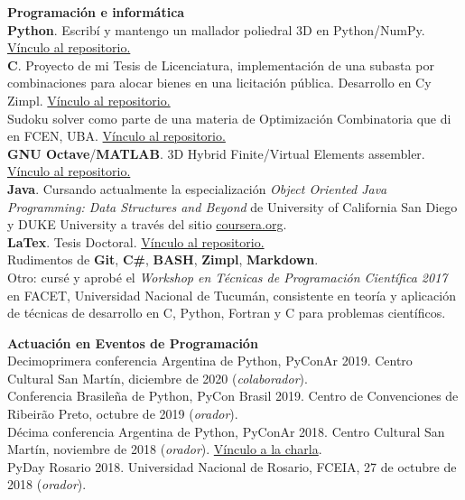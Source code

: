 \textbf{Programaci\'on e inform\'atica}\\[6pt]
\textbf{Python}. Escrib\'i y mantengo un mallador poliedral 3D en Python/NumPy. 
\href{https://github.com/alexisjawtu/mesher}{\color{blue}V\'inculo al repositorio.}\\[3pt]
\textbf{C\masmas}. Proyecto de mi Tesis de Licenciatura, implementaci\'on de una 
subasta por combinaciones para alocar bienes en una licitaci\'on p\'ublica. Desarrollo
en C\masmas y Zimpl. 
\href{https://github.com/alexisjawtu/ilp_auction}{\color{blue}V\'inculo al repositorio.}\\[3pt]
Sudoku solver como parte de una materia de Optimizaci\'on Combinatoria que di en FCEN, UBA.
\href{https://github.com/alexisjawtu/sudoku}{\color{blue}V\'inculo al repositorio.}\\[3pt]
\textbf{GNU Octave}/\textbf{MATLAB}. 3D Hybrid Finite/Virtual Elements assembler. 
\href{https://github.com/alexisjawtu/virtualAssembler}{\color{blue}V\'inculo al repositorio.}\\[3pt]
\textbf{Java}. Cursando actualmente la especializaci\'on 
\emph{Object Oriented Java Programming: Data Structures and Beyond} de University of California 
San Diego y DUKE University a trav\'es del sitio 
\href{https://www.coursera.org}{\color{blue}coursera.org}.\\[3pt]
\textbf{LaTex}. Tesis Doctoral. \href{https://github.com/alexisjawtu/tesis}{\color{blue}V\'inculo al repositorio.}\\[3pt]
Rudimentos de \textbf{Git}, \textbf{C\#}, \textbf{BASH}, \textbf{Zimpl}, \textbf{Markdown}.\\[3pt]
Otro: curs\'e y aprob\'e el \emph{Workshop en T\'ecnicas de Programaci\'on Cient\'ifica 2017} en FACET, 
Universidad Nacional de Tucum\'an, consistente en teor\'ia y aplicaci\'on de t\'ecnicas 
de desarrollo en C, Python, Fortran y C\masmas\,\,para problemas cient\'ificos.

\textbf{Actuaci\'on en Eventos de Programaci\'on}\\[6pt]
Decimoprimera conferencia Argentina de Python, PyConAr 2019. Centro Cultural San Mart\'in, 
diciembre de 2020 (\emph{colaborador}).\\[4pt]
Conferencia Brasile\~na de Python, PyCon Brasil 2019. Centro de Convenciones de 
Ribeir\~ao Preto, octubre de 2019 (\emph{orador}).\\[4pt]
D\'ecima conferencia Argentina de Python, PyConAr 2018.
Centro Cultural San Mart\'in, noviembre de 2018 (\emph{orador}). 
\href{https://www.youtube.com/watch?v=ywt5wY4HB9E&t=662s}{\color{blue}V\'inculo a la charla}.\\[4pt]
PyDay Rosario 2018. Universidad Nacional de Rosario, FCEIA, 27 de octubre 
de 2018 (\emph{orador}). %

